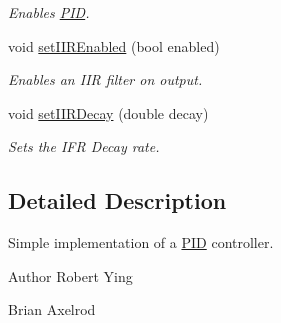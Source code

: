 \begin{DoxyCompactItemize}
\begin{DoxyCompactList}\small\item\em Enables \hyperlink{class_rhesus_1_1_toolkit_1_1_control_1_1_p_i_d}{P\-I\-D}. \end{DoxyCompactList}\item 
\hypertarget{class_rhesus_1_1_toolkit_1_1_control_1_1_p_i_d_ab99ae2745f14726ab0950db624b37810}{void \hyperlink{class_rhesus_1_1_toolkit_1_1_control_1_1_p_i_d_ab99ae2745f14726ab0950db624b37810}{set\-I\-I\-R\-Enabled} (bool enabled)}\label{class_rhesus_1_1_toolkit_1_1_control_1_1_p_i_d_ab99ae2745f14726ab0950db624b37810}

\begin{DoxyCompactList}\small\item\em Enables an I\-I\-R filter on output. \end{DoxyCompactList}\item 
\hypertarget{class_rhesus_1_1_toolkit_1_1_control_1_1_p_i_d_a8fe00f5547895b5563ec687a6a4672d8}{void \hyperlink{class_rhesus_1_1_toolkit_1_1_control_1_1_p_i_d_a8fe00f5547895b5563ec687a6a4672d8}{set\-I\-I\-R\-Decay} (double decay)}\label{class_rhesus_1_1_toolkit_1_1_control_1_1_p_i_d_a8fe00f5547895b5563ec687a6a4672d8}

\begin{DoxyCompactList}\small\item\em Sets the I\-F\-R Decay rate. \end{DoxyCompactList}\end{DoxyCompactItemize}


\subsection{Detailed Description}
Simple implementation of a \hyperlink{class_rhesus_1_1_toolkit_1_1_control_1_1_p_i_d}{P\-I\-D} controller. 

\begin{DoxyAuthor}{Author}
Robert Ying 

Brian Axelrod 
\end{DoxyAuthor}


